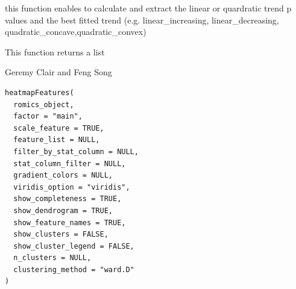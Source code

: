\documentclass[a4paper]{book}
\begin{document}
%
\begin{Details}
this function enables to calculate and extract the linear or quardratic trend p values and the best fitted trend (e.g. linear\_increasing, linear\_decreasing, quadratic\_concave,quadratic\_convex)
\end{Details}
%
\begin{Value}
This function returns a list
\end{Value}
%
\begin{Author}
Geremy Clair and Feng Song
\end{Author}
%
\begin{Usage}
\begin{verbatim}
heatmapFeatures(
  romics_object,
  factor = "main",
  scale_feature = TRUE,
  feature_list = NULL,
  filter_by_stat_column = NULL,
  stat_column_filter = NULL,
  gradient_colors = NULL,
  viridis_option = "viridis",
  show_completeness = TRUE,
  show_dendrogram = TRUE,
  show_feature_names = TRUE,
  show_clusters = FALSE,
  show_cluster_legend = FALSE,
  n_clusters = NULL,
  clustering_method = "ward.D"
)
\end{verbatim}
\end{Usage}
%
\end{document}
